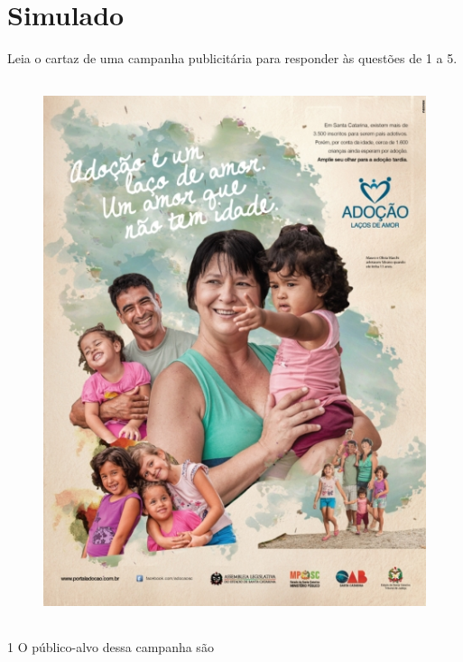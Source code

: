 \setcounter{chapter}{0}
\chapter[Simulados]{Simulado}

Leia o cartaz de uma campanha publicitária para responder às questões de
1 a 5.


\begin{figure}[htpb!]
\centering
\includegraphics[width=4.68750in,height=6.25000in]{./_SAEB_9_POR/media/image33.jpeg}
\end{figure}


\num{1} O público-alvo dessa campanha são

